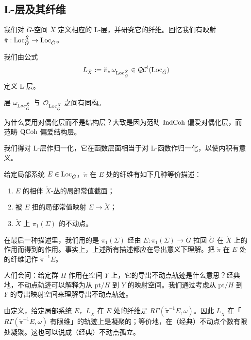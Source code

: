 \subsection{L-层及其纤维}

我们对 $\check G$-空间 $\check X$ 定义相应的 L-层，并研究它的纤维。回忆我们有映射 $\check\pi:\operatorname{Loc}^{\check X}_{\check G}\to\operatorname{Loc}_{\check G}$。

\begin{defn}
我们由公式
\[
  L_{\check X}:=\check\pi_*\,\omega_{\operatorname{Loc}^{\check X}_{\check G}}\in\mathcal{QC}^!(\operatorname{Loc}_{\check G})
\]
定义 L-层。
\end{defn}

\begin{rem}
层 $\omega_{\operatorname{Loc}^{\check X}_{\check G}}$ 与 $\mathcal O_{\operatorname{Loc}^{\check X}_{\check G}}$ 之间有同构。
\end{rem}

\begin{rem}
为什么要用对偶化层而不是结构层？大致是因为范畴 $\operatorname{IndCoh}$ 偏爱对偶化层，而范畴 $\operatorname{QCoh}$ 偏爱结构层。
\end{rem}

\begin{rem}
我们得对 L-层作归一化，它在函数层面相当于对 L-函数作归一化，以使内积有意义。
\end{rem}

给定局部系统 $E\in\operatorname{Loc}_{\check G}$，$\check\pi$ 在 $E$ 处的纤维有如下几种等价描述：

\begin{enumerate}[label=(\arabic*),leftmargin=1.8em]
  \item $E$ 的相伴 $\check X$-丛的局部常值截面；
  \item 被 $E$ 扭的局部常值映射 $\Sigma\to\check X$；
  \item $\check X$ 上 $\pi_1(\Sigma)$ 的不动点。
\end{enumerate}

在最后一种描述里，我们用的是 $\pi_1(\Sigma)$ 经由 $E:\pi_1(\Sigma)\to\check G$ 拉回 $\check G$ 在 $\check X$ 上的作用而得到的作用。事实上，上述所有描述都应在导出意义下理解。把 $\check\pi$ 在 $E$ 处的纤维记作 $\check\pi^{-1}E$。

\begin{rem}
人们会问：给定群 $H$ 作用在空间 $Y$ 上，它的导出不动点轨迹是什么意思？经典地，不动点轨迹可以解释为从 $\mathrm{pt}/H$ 到 $Y$ 的映射空间。我们通过考虑从 $\mathrm{pt}/H$ 到 $Y$ 的导出映射空间来理解导出不动点轨迹。
\end{rem}

由定义，给定局部系统 $E$，$L_{\check X}$ 在 $E$ 处的纤维是 $R\Gamma(\check\pi^{-1}E,\omega)$。因此 $L_{\check X}$ 在「$R\Gamma(\check\pi^{-1}E,\omega)$ 有限维」的轨迹上是凝聚的；等价地，在（经典）不动点个数有限处凝聚。这也可以说成（经典）不动点孤立。

